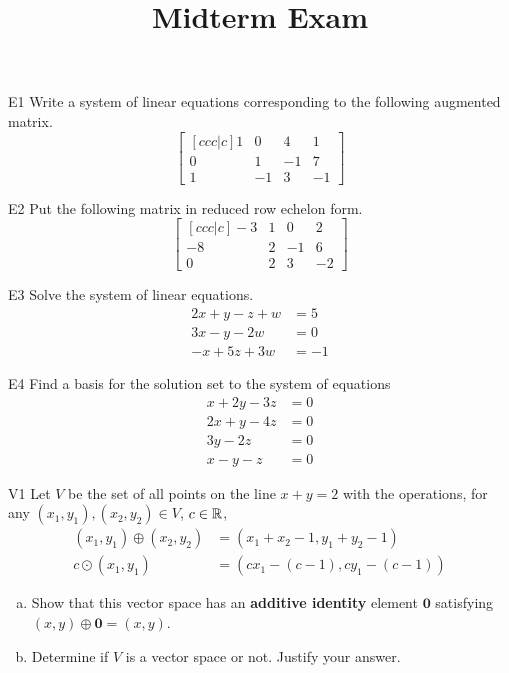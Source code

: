 \documentclass{sbgLAexam}
\title{Midterm Exam}
\begin{document}
\begin{problem}{E1}
Write a system of linear equations corresponding to the following
augmented matrix.
\[
\begin{bmatrix}[ccc|c]
1 & 0 & 4 & 1 \\
0 & 1 & -1 & 7 \\
1 & -1 & 3 & -1
\end{bmatrix}
\]
\end{problem}

\begin{problem}{E2}
Put the following matrix in reduced row echelon form.
$$\begin{bmatrix}[ccc|c] -3 & 1 & 0 & 2 \\ -8 & 2 & -1 & 6 \\ 0 & 2 & 3 & -2 \end{bmatrix}$$
\end{problem}
\newpage

\begin{problem}{E3}
Solve the system of linear equations.
\begin{align*}
2x+y-z+w &=5 \\
3x-y-2w &= 0 \\
-x+5z+3w&=-1
\end{align*}
\end{problem}

\begin{problem}{E4}
Find a basis for the solution set to the system of equations
\begin{align*}
x+2y-3z &= 0 \\
2x+y-4z &= 0 \\
3y -2z & = 0 \\
x -y -z &= 0
\end{align*}
\end{problem}
\newpage

\begin{problem}{V1}
Let $V$ be the set of all points on the line $x+y=2$ with the operations, for any $(x_1,y_1), (x_2,y_2) \in V$, $c \in \mathbb{R}$,
\begin{align*}
(x_1,y_1) \oplus (x_2,y_2) &= (x_1+x_2-1,y_1+y_2-1) \\
c \odot (x_1,y_1) &= (cx_1-(c-1), cy_1-(c-1))
\end{align*}
\begin{enumerate}[(a)]
\item Show that this vector space has an \textbf{additive identity} element
      \(\mathbf{0}\) satisfying \((x,y)\oplus\mathbf{0}=(x,y)\).
\item Determine if $V$ is a vector space or not.  Justify your answer.
\end{enumerate}
\end{problem}
\end{document}
